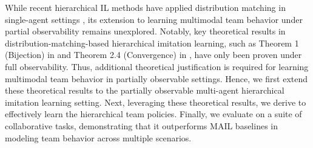 While recent hierarchical IL methods have applied distribution matching in single-agent settings \cite{jing2021adversarial,seo2024idil}, its extension to learning multimodal team behavior under partial observability remains unexplored. Notably, key theoretical results in distribution-matching-based hierarchical imitation learning, such as Theorem 1 (Bijection) in \cite{jing2021adversarial} and Theorem 2.4 (Convergence) in \cite{seo2024idil}, have only been proven under full observability. Thus, additional theoretical justification is required for learning multimodal team behavior in partially observable settings.
Hence, we first extend these theoretical results to the partially observable multi-agent hierarchical imitation learning setting. Next, leveraging these theoretical results, we derive \ouralg to effectively learn the hierarchical team policies. Finally, we evaluate \ouralg on a suite of collaborative tasks, demonstrating that it outperforms MAIL baselines in modeling team behavior across multiple scenarios.